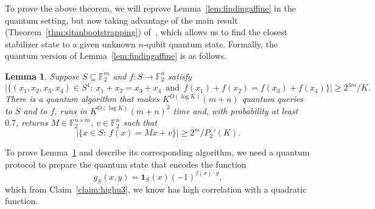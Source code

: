 \documentclass[11pt]{amsart}
\newcommand{\F}{\mathbb{F}} %
\newcommand{\one}{\mathbf{1}}
\theoremstyle{plain}
\newtheorem{lemma}[theorem]{Lemma}
\theoremstyle{definition}
\theoremstyle{remark}
\begin{document}
To prove the above theorem, we will reprove Lemma~\ref{lem:findingaffine} in the quantum setting, but now taking advantage of the main result (Theorem~\ref{thm:sitanbootstrapping}) of~\cite{chen2024stabilizer}, which allows us to find the closest stabilizer state to a given unknown $n$-qubit quantum state. Formally, the quantum version of Lemma~\ref{lem:findingaffine} is as follows.

\begin{lemma}
\label{lem:findingfreimanquantum}
Suppose $S\subseteq \F_2^m$ and $f: S \to \F_2^n$ satisfy
$$\big|\big\{(x_1, x_2, x_3, x_4)\in S^4:\: x_1+x_2 = x_3+x_4 \,\text{ and }\, f(x_1)+f(x_2) = f(x_3)+f(x_4)\big\}\big| \geq 2^{3m}/K.$$
There is a quantum algorithm that makes $K^{O(\log K)} (m+n)$ quantum queries to $S$ and to $f$, runs in $K^{O(\log K)}(m+n)^3$ time and, with probability at least $0.7$, returns $M\in \F_2^{n\times m}$, $v\in \F_2^n$ such that
$$\big|\big\{x\in S:\: f(x) = Mx+v\big\}\big| \geq 2^m/P_2'(K).$$
\end{lemma}

To prove Lemma~\ref{lem:findingfreimanquantum} and describe its corresponding algorithm, we need a quantum protocol to prepare the quantum state that encodes the function 
$$
g_S(x,y) = \one_S(x) (-1)^{f(x)\cdot y},
$$
which from Claim~\ref{claim:highu3}, we know has high correlation with a quadratic function.
\end{document}
